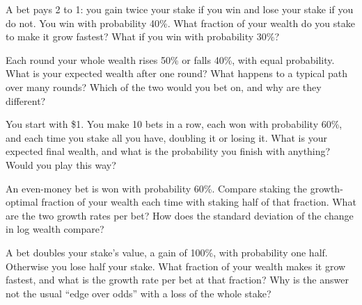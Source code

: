 \begin{question}\label{iq:iv2:betting-and-kelly:4}
A bet pays 2 to 1: you gain twice your stake if you win and lose your stake if you do not. You win with probability 40\%. What fraction of your wealth do you stake to make it grow fastest? What if you win with probability 30\%?
\end{question}

\begin{question}\label{iq:iv2:betting-and-kelly:5}
Each round your whole wealth rises 50\% or falls 40\%, with equal probability. What is your expected wealth after one round? What happens to a typical path over many rounds? Which of the two would you bet on, and why are they different?
\end{question}

\begin{question}\label{iq:iv2:betting-and-kelly:6}
You start with \$1. You make 10 bets in a row, each won with probability 60\%, and each time you stake all you have, doubling it or losing it. What is your expected final wealth, and what is the probability you finish with anything? Would you play this way?
\end{question}

\begin{question}\label{iq:iv2:betting-and-kelly:7}
An even-money bet is won with probability 60\%. Compare staking the growth-optimal fraction of your wealth each time with staking half of that fraction. What are the two growth rates per bet? How does the standard deviation of the change in log wealth compare?
\end{question}

\begin{question}\label{iq:iv2:betting-and-kelly:8}
A bet doubles your stake's value, a gain of 100\%, with probability one half. Otherwise you lose half your stake. What fraction of your wealth makes it grow fastest, and what is the growth rate per bet at that fraction? Why is the answer not the usual ``edge over odds'' with a loss of the whole stake?
\end{question}

